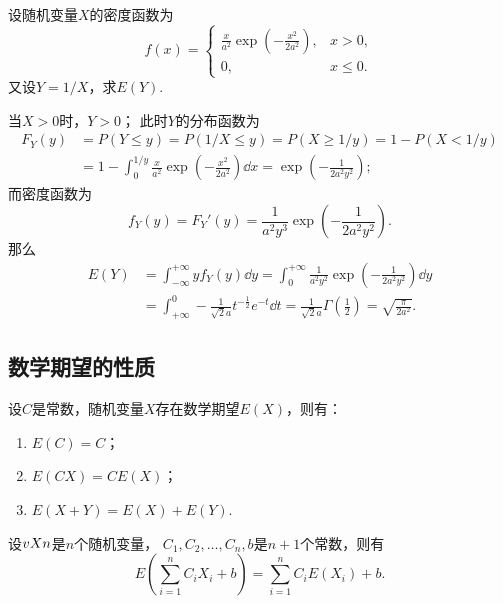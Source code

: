 \begin{example}
设随机变量\(X\)的密度函数为\[
f(x) = \left\{ \begin{array}{cl}
\frac{x}{a^2} \exp(-\frac{x^2}{2a^2}), & x>0, \\
0, & x \leqslant 0.
\end{array} \right.
\]又设\(Y = 1/X\)，求\(E(Y)\).
\begin{solution}
当\(X>0\)时，\(Y>0\)；
此时\(Y\)的分布函数为\[\begin{aligned}
F_Y(y)
&= P(Y \leqslant y)
= P(1/X \leqslant y)
= P(X \geqslant 1/y)
= 1 - P(X < 1/y) \\
&= 1 - \int_0^{1/y} \frac{x}{a^2} \exp(-\frac{x^2}{2a^2}) \dd{x}
= \exp(-\frac{1}{2a^2y^2});
\end{aligned}\]
而密度函数为\[
f_Y(y) = F_Y'(y)
= \frac{1}{a^2 y^3} \exp(-\frac{1}{2a^2y^2}).
\]那么\[\begin{aligned}
E(Y)
&= \int_{-\infty}^{+\infty} y f_Y(y) \dd{y}
= \int_0^{+\infty} \frac{1}{a^2 y^2} \exp(-\frac{1}{2a^2y^2}) \dd{y} \\
&= \int_{+\infty}^0 -\frac{1}{\sqrt{2} a} t^{-\frac{1}{2}} e^{-t} \dd{t}
= \frac{1}{\sqrt{2} a} \Gamma\left(\frac{1}{2}\right)
= \sqrt{\frac{\pi}{2a^2}}.
\end{aligned}\]
\end{solution}
\end{example}

\subsection{数学期望的性质}
\begin{property}\label{theorem:随机变量的数字特征.数学期望的性质1}
设\(C\)是常数，随机变量\(X\)存在数学期望\(E(X)\)，则有：
\begin{enumerate}
\item \(E(C) = C\)；
\item \(E(C X) = C E(X)\)；
\item \(E(X+Y) = E(X)+E(Y)\).
\end{enumerate}
\end{property}

\begin{property}[线性性质]\label{theorem:随机变量的数字特征.数学期望的性质2}
设\(v{X}{n}\)是\(n\)个随机变量，%
\(C_1,C_2,\dotsc,C_n,b\)是\(n+1\)个常数，则有\[
E\left(\sum\limits_{i=1}^n C_i X_i + b\right)
=\sum\limits_{i=1}^n C_i E(X_i) + b.
\]
\end{property}

